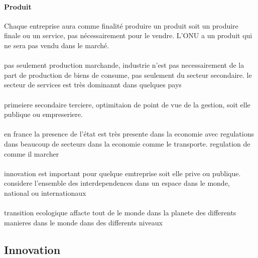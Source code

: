 \documentclass{article}
\begin{document}
\newpage
\paragraph{Produit}Chaque entreprise aura comme finalité produire un produit soit un produire finale ou un service, pas nécessairement pour le vendre. L'ONU a un produit qui ne sera pas vendu dans le marché.

\paragraph{}pas seulement production marchande, industrie n'est pas necessairement de la part de production de biens de consume, pas seulement du secteur secondaire. le secteur de services est très dominannt dans quelques pays

\paragraph{}primeiere secondaire terciere, optimitaion de point de vue de la gestion, soit elle publique ou empreseriere.

\paragraph{}en france la presence de l'état est très presente dans la economie avec regulations dans beaucoup de secteurs dans la economie comme le transporte. regulation de comme il marcher

\paragraph{}innovation est important pour quelque emtreprise soit elle prive ou publique. considere l'ensemble des interdependences dans un espace dans le monde, national ou internationaux 

\paragraph{}transition ecologique affacte tout de le monde dans la planete des differents manieres dans le monde dans des differents niveaux


\subsection{Innovation}
\end{document}
